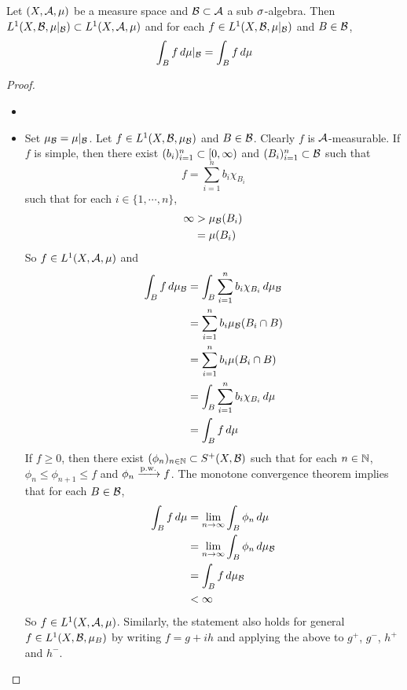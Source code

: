 \documentclass{book}
\begin{document}
	\begin{ex}  
		Let $(X, \mathcal{A}, \mu)$ be a measure space and $\mathcal{B} \subset \mathcal{A}$ a sub $\sigma$-algebra. Then $ L^1(X, \mathcal{B}, \mu|_{\mathcal{B}}) \subset L^1(X, \mathcal{A}, \mu)$ and for each $f \in L^1(X, \mathcal{B}, \mu|_{\mathcal{B}})$ and $B \in \mathcal{B}$, 
		$$\int_B f \, d \mu|_{\mathcal{B}} = \int_B f \, d \mu$$
	\end{ex}
	
	\begin{proof}\
		\begin{itemize}
			\item {}
			\item Set $\mu_{\mathcal{B}} = \mu|_{\mathcal{B}}$. Let $f \in L^1(X, \mathcal{B}, \mu_{\mathcal{B}})$ and $B \in \mathcal{B}$. Clearly $f$ is $\mathcal{A}$-measurable. If $f$ is simple, then there exist $(b_i)_{i=1}^n \subset [0,\infty)$ and $(B_i)_{i=1}^n \subset \mathcal{B}$ such that $$f = \sum\limits_{i=1}^n b_i \chi_{B_i}$$ such that for each $i \in \{1, \cdots, n\}$, 
			\begin{align*}
				\infty 
				&> \mu_{\mathcal{B}}(B_i) \\
				&= \mu(B_i)
			\end{align*}
			So $f \in L^1(X, \mathcal{A}, \mu)$ and 
			\begin{align*}
				\int_B f \, d \mu_{\mathcal{B}} 
				&= \int_B \sum\limits_{i=1}^n b_i \chi_{B_i} \, d \mu_{\mathcal{B}} \\
				&= \sum\limits_{i=1}^n b_i \mu_{\mathcal{B}}(B_i \cap B)\\
				&= \sum\limits_{i=1}^n b_i \mu(B_i \cap B)\\
				&= \int_B \sum\limits_{i=1}^n b_i\chi_{B_i} \, d \mu \\
				&= \int_B f \, d \mu
			\end{align*}
			If $f \geq 0$, then there exist $(\phi_n)_{n \in \mathbb{N}} \subset S^+(X, \mathcal{B})$ such that for each $n \in \mathbb{N}$, $\phi_n \leq \phi_{n+1} \leq f$ and $\phi_n \xrightarrow{\text{p.w.}} f$. The monotone convergence theorem implies that for each $B \in \mathcal{B}$,
			\begin{align*}
				\int_B f \, d \mu
				&= \lim \limits_{n \rightarrow \infty} \int_B \phi_n \, d \mu \\
				&= \lim \limits_{n \rightarrow \infty} \int_B \phi_n \, d \mu_{\mathcal{B}} \\
				& = \int_B f \, d \mu_{\mathcal{B}} \\
				& < \infty
			\end{align*}
			So $f \in L^1(X, \mathcal{A}, \mu)$.
			Similarly, the statement also holds for general $f \in L^1(X, \mathcal{B}, \mu_B)$ by writing $f = g+ih$ and applying the above to $g^+$, $g^-$, $h^+$ and $h^-$.
		\end{itemize}
	\end{proof}
	
\end{document}
